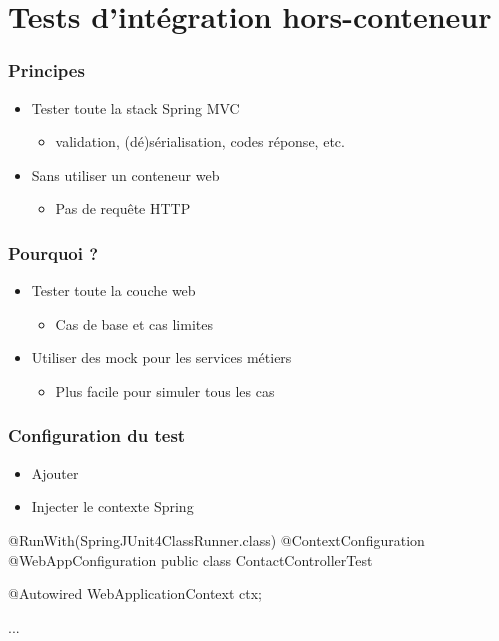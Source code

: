 \section{Tests d'intégration hors-conteneur}


\begin{frame}
 \frametitle{Principes}
 \begin{itemize}
  \item Tester toute la stack Spring MVC
  \begin{itemize}
   \item validation, (dé)sérialisation, codes réponse, etc.
  \end{itemize}
  \item Sans utiliser un conteneur web
  \begin{itemize}
   \item Pas de requête HTTP
  \end{itemize}
 \end{itemize}
\end{frame}

\begin{frame}
 \frametitle{Pourquoi ?}
 
 \begin{itemize}
  \item Tester toute la couche web
  \begin{itemize}
   \item Cas de base et cas limites
  \end{itemize}
  \item Utiliser des mock pour les services métiers
  \begin{itemize}
   \item Plus facile pour simuler tous les cas
  \end{itemize}
 \end{itemize} 

\end{frame}

\begin{frame}[fragile]
 \frametitle{Configuration du test}
 
 \begin{itemize}
  \item Ajouter 
  \item Injecter le contexte Spring
 \end{itemize}

 
 \begin{javacode}
@RunWith(SpringJUnit4ClassRunner.class)
@ContextConfiguration
@WebAppConfiguration
public class ContactControllerTest {

  @Autowired
  WebApplicationContext ctx;
  
  ...
}
 \end{javacode}

\end{frame}

